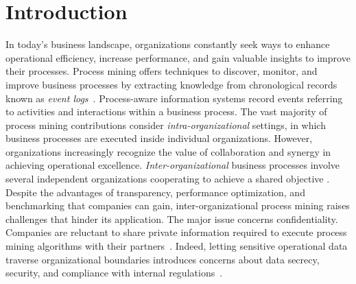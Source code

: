 \section{Introduction}
\label{sec:introduction}
\begin{comment}
\todo[inline]{%
	´CDC: Status corrente secondo me. Abbiamo\ldots
	Un'intro affabile ma che dobbiamo ricalibrare per toglierla dal pantano della TEE e puntare dritto al nostro obiettivo dichiarato e mantenuto, con vista sul potenziale inespresso.\\
	Un motivating scenario che però resta staccato dal resto.\\
	Un related work che però dovrebbe spostarsi sul far capire cosa facciamo di più e di diverso, o di simile ma rivisto.\\
	Una overview eccellente dell'architettura che però non è connessa con l'esempio.\\
	Una overview accurata delle interazioni dei moduli (e quando lo spazio è poco è il caso di fare il merge tra le due cose per risparmiare spazio, come ci dicemmo) -- anche qui senza esempio, dunque capire cosa si fa dove è arduo. Non per me o per te, ma perché conosciamo il lavoro. Chi non lo conosce, non ha assolutamente idea di cosa voglia dire fare il merge degli eventi da tracce provienienti da actor diversi rimettendoli in ordine così da preservare integrità temporale, per esempio.\\
	Una discussion/evaluation ben congegnata in cui però manca la parte quantitativa e la qualitativa è ancora da dettagliare.\\
	Una conclusione.%
}
\end{comment}
In today's business landscape, organizations constantly seek ways to enhance operational efficiency, increase performance, and gain valuable insights to improve their processes. Process mining offers techniques to discover, monitor, and improve business processes by extracting knowledge from chronological records known as \textit{event logs}~\cite{DBLP:books/sp/22/WeerdtW22}.
Process-aware information systems record events referring to activities and interactions within a business process. The vast majority of process mining contributions consider \textit{intra-organizational} settings, in which business processes are executed inside individual organizations. However, organizations increasingly recognize the value of collaboration and synergy in achieving operational excellence. \textit{Inter-organizational} business processes involve several independent organizations cooperating to achieve a shared objective \cite{van2011intra}. Despite the advantages of transparency, performance optimization, and benchmarking that companies can gain, inter-organizational process mining raises challenges that hinder its application. The major issue concerns confidentiality. Companies are reluctant to share private information required to execute process mining algorithms with their partners~\cite{liu2009challenges}. Indeed, letting sensitive operational data traverse organizational boundaries introduces concerns about data secrecy, security, and compliance with internal regulations~\cite{muller2021trust}. 
